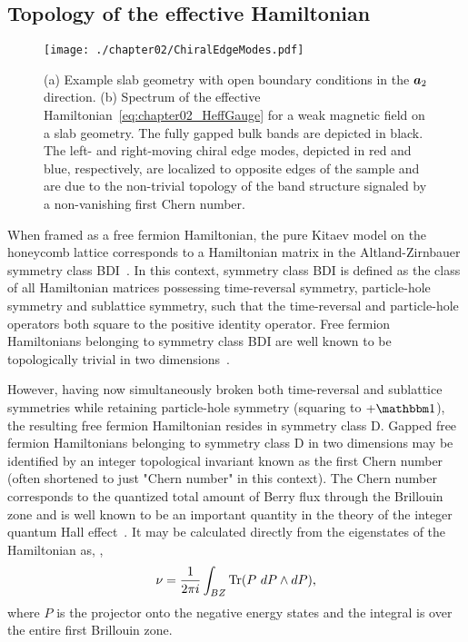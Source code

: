 %
%
\subsection{Topology of the effective Hamiltonian}
%
%
%
\begin{figure}[tb]
	\centering
	\texttt{[image: ./chapter02/ChiralEdgeModes.pdf]}
	\caption{
		(a) Example slab geometry with open boundary conditions in the $\bm{a}_2$ direction.
		(b) Spectrum of the effective Hamiltonian~\eqref{eq:chapter02_HeffGauge} for a weak magnetic field on a slab geometry.
		The fully gapped bulk bands are depicted in black.
		The left- and right-moving chiral edge modes, depicted in red and blue, respectively, are localized to opposite edges of the sample and are due to the non-trivial topology of the band structure signaled by a non-vanishing first Chern number.
	}
	\label{fig:chapter02_EdgeModes}
\end{figure}
%
When framed as a free fermion Hamiltonian, the pure Kitaev model on the honeycomb lattice corresponds to a Hamiltonian matrix in the Altland-Zirnbauer symmetry class BDI~\cite{ZirnbauerJMP1996,AltlandPRB1997}.
In this context, symmetry class BDI is defined as the class of all Hamiltonian matrices possessing time-reversal symmetry, particle-hole symmetry and sublattice symmetry, such that the time-reversal and particle-hole operators both square to the positive identity operator.
Free fermion Hamiltonians belonging to symmetry class BDI are well known to be topologically trivial in two dimensions~\cite{KitaevAIP2009,RyuNJP2010,WenPRB2012}.

However, having now simultaneously broken both time-reversal and sublattice symmetries while retaining particle-hole symmetry (squaring to $+\id$), the resulting free fermion Hamiltonian resides in symmetry class D.
Gapped free fermion Hamiltonians belonging to symmetry class D in two dimensions may be identified by an integer topological invariant known as the first Chern number~\cite{KitaevAIP2009,RyuNJP2010,WenPRB2012} (often shortened to just "Chern number" in this context).
The Chern number corresponds to the quantized total amount of Berry flux through the Brillouin zone and is well known to be an important quantity in the theory of the integer quantum Hall effect~\cite{ThoulessPRL1982,AvronPRL1983,BellissardJMP1994}.
It may be calculated directly from the eigenstates of the Hamiltonian as, \eg,
%
\begin{equation}
	\nu = \frac{1}{2\pi i} \int_{BZ} \text{Tr}{(P~dP \wedge dP)},
\end{equation}
%
where $P$ is the projector onto the negative energy states and the integral is over the entire first Brillouin zone.

